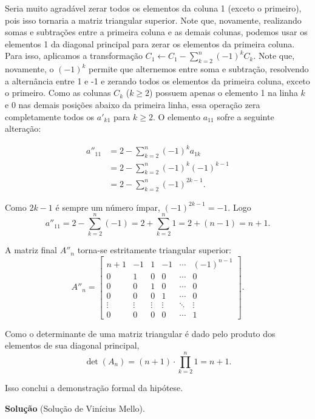\documentclass{hipatia}
\begin{document}
Seria muito agradável zerar todos os elementos da coluna 1 (exceto o primeiro), pois isso tornaria a matriz triangular superior. Note que, novamente, realizando somas e subtrações entre a primeira coluna e as demais colunas, podemos usar os elementos 1 da diagonal principal para zerar os elementos da primeira coluna. Para isso, aplicamos a transformação $C_1 \leftarrow C_1 - \sum_{k=2}^n (-1)^k C_k$. Note que, novamente, o $(-1)^k$ permite que alternemos entre soma e subtração, resolvendo a alternância entre 1 e -1 e zerando todos os elementos da primeira coluna, exceto o primeiro. Como as colunas $C_k$ ($k \ge 2$) possuem apenas o elemento 1 na linha $k$ e 0 nas demais posições abaixo da primeira linha, essa operação zera completamente todos os $a'_{k1}$ para $k \ge 2$. O elemento $a_{11}$ sofre a seguinte alteração:

\begin{align*}
    a''_{11} &= 2 - \sum_{k=2}^n (-1)^k a_{1k} \\ &= 2 - \sum_{k=2}^n (-1)^k (-1)^{k-1} \\ &= 2 - \sum_{k=2}^n (-1)^{2k-1}.\end{align*}

Como $2k-1$ é sempre um número ímpar, $(-1)^{2k-1} = -1$. Logo
$$a''_{11} = 2 - \sum_{k=2}^n (-1) = 2 + \sum_{k=2}^n 1 = 2 + (n-1) = n+1.$$

A matriz final $A''_n$ torna-se estritamente triangular superior:
$$A''_n = \begin{bmatrix}
n+1 & -1 & 1 & -1 & \cdots & (-1)^{n-1} \\
0 & 1 & 0 & 0 & \cdots & 0 \\
0 & 0 & 1 & 0 & \cdots & 0 \\
0 & 0 & 0 & 1 & \cdots & 0 \\
\vdots & \vdots & \vdots & \vdots & \ddots & \vdots \\
0 & 0 & 0 & 0 & \cdots & 1
\end{bmatrix}.$$

Como o determinante de uma matriz triangular é dado pelo produto dos elementos de sua diagonal principal,
$$\det(A_n) = (n+1) \cdot \prod_{k=2}^n 1 = n+1.$$

Isso conclui a demonstração formal da hipótese.

\vspace{1cm}

\noindent \textbf{Solução} (Solução de Vinícius Mello).
\end{document}
